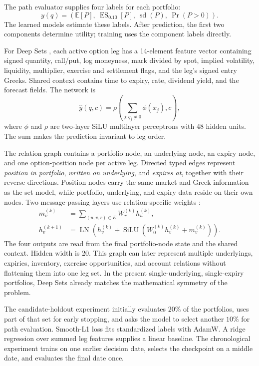 \documentclass{strategynet-journal}
\newcommand{\ES}{\operatorname{ES}}
\begin{document}
\begin{SNcolumns}

The path evaluator supplies four labels for each portfolio:
\[
  y(q)=\left(
    \mathbb E[P],\
    \ES_{0.10}[P],\
    \operatorname{sd}(P),\
    \Pr(P>0)
  \right).
\]
The learned models estimate these labels.  After prediction, the first two
components determine utility; training uses the component labels directly.

For Deep Sets \cite{deepsets}, each active option leg has a 14-element feature
vector containing signed quantity, call/put, log moneyness, mark divided by
spot, implied volatility, liquidity, multiplier, exercise and settlement
flags, and the leg's signed entry Greeks.  Shared context contains time to
expiry, rate, dividend yield, and the forecast fields.  The network is
\[
  \widehat y(q,c)
  =\rho\!\left(\sum_{j:q_j\ne0}\phi(x_j),c\right),
\]
where \(\phi\) and \(\rho\) are two-layer SiLU multilayer perceptrons with
48 hidden units.  The sum makes the prediction invariant to leg order.

The relation graph contains a portfolio node, an underlying node, an expiry
node, and one option-position node per active leg.  Directed typed edges
represent \emph{position in portfolio}, \emph{written on underlying}, and
\emph{expires at}, together with their reverse directions.  Position nodes
carry the same market and Greek information as the set model, while
portfolio, underlying, and expiry data reside on their own nodes.  Two
message-passing layers use relation-specific weights
\cite{graphnetworks}:
\[
  \begin{aligned}
  m_v^{(k)}
    &=\sum_{(u,v,r)\in E}W_r^{(k)}h_u^{(k)},\\
  h_v^{(k+1)}
    &=\operatorname{LN}\!\left(
       h_v^{(k)}
       +\operatorname{SiLU}(W_0^{(k)}h_v^{(k)}+m_v^{(k)})
     \right).
  \end{aligned}
\]
The four outputs are read from the final portfolio-node state and the shared
context.  Hidden width is 20.  This graph can later represent multiple
underlyings, expiries, inventory, exercise opportunities, and account
relations without flattening them into one leg set.  In the present
single-underlying, single-expiry portfolios, Deep Sets already matches the
mathematical symmetry of the problem.

The candidate-holdout experiment initially evaluates \(20\%\) of the
portfolios, uses part of that set for early stopping, and asks the model to
select another \(10\%\) for path evaluation.  Smooth-L1 loss fits standardized
labels with AdamW.  A ridge regression over summed leg features supplies a
linear baseline.  The chronological experiment trains on one earlier
decision date, selects the checkpoint on a middle date, and evaluates the
final date once.


\end{SNcolumns}
\end{document}
